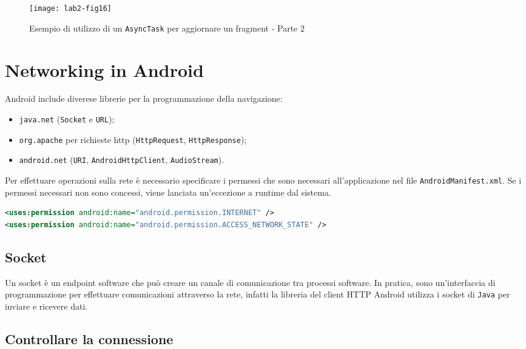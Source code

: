 \begin{figure*}[htbp]
	\centering
	\texttt{[image: lab2-fig16]}
	\caption[AsyncTask per aggiornare Fragment - 2]{Esempio di utilizzo di un \texttt{AsyncTask} per aggiornare un fragment - Parte 2}
	\label{img:lab2-fig16}
\end{figure*}

\section{Networking in Android}

Android include diverese librerie per la programmazione della navigazione:
\begin{itemize}
\item \texttt{java.net} (\texttt{Socket} e \texttt{URL});
\item \texttt{org.apache} per richieste http (\texttt{HttpRequest}, \texttt{HttpResponse});
\item \texttt{android.net} (\texttt{URI}, \texttt{AndroidHttpClient}, \texttt{AudioStream}).
\end{itemize}

Per effettuare operazioni sulla rete è necessario specificare i permessi che sono necessari all'applicazione nel file \texttt{AndroidManifest.xml}. Se i permessi necessari non sono concessi, viene lanciata un'eccezione a runtime dal sistema.

\begin{lstlisting}[language=XML, basicstyle=\footnotesize]
<uses:permission android:name="android.permission.INTERNET" />
<uses:permission android:name="android.permission.ACCESS_NETWORK_STATE" />
\end{lstlisting}

\subsection{Socket}

Un socket è un endpoint software che può creare un canale di comunicazione tra processi software. In pratica, sono un'interfaccia di programmazione per effettuare comunicazioni attraverso la rete, infatti la libreria del client HTTP Android utilizza i socket di \texttt{Java} per inviare e ricevere dati. 


\subsection{Controllare la connessione}

